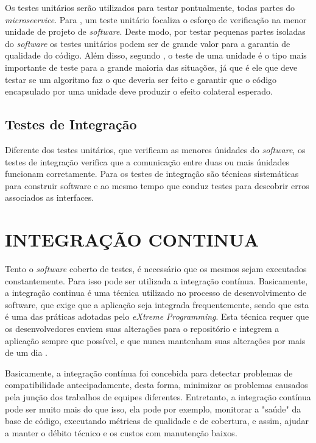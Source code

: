 Os testes unitários serão utilizados para testar pontualmente, todas partes do \textit{microseervice}. Para , um teste unitário focaliza o esforço de verificação na menor unidade de projeto de \textit{software}. Deste modo, por testar pequenas partes isoladas do \textit{software} os testes unitários podem ser de grande valor para a garantia de qualidade do código. Além disso, segundo , o teste de uma unidade é o tipo mais importante de teste para a grande maioria das situações, já que é ele que deve testar se um algoritmo faz o que deveria ser feito e garantir que o código encapsulado por uma unidade deve produzir o efeito colateral esperado.

\subsection{Testes de Integração}

Diferente dos testes unitários, que verificam as menores únidades do \textit{software}, os testes de integração verifica que a comunicação entre duas ou mais únidades funcionam corretamente. Para  os testes de integração são técnicas sistemáticas para construir software e ao mesmo tempo que conduz testes para descobrir erros associados as interfaces.

\section{INTEGRAÇÃO CONTINUA}

Tento o \textit{software} coberto de testes, é necessário que os mesmos sejam executados constantemente. Para isso pode ser utilizada a integração contínua. Basicamente, a integração continua é uma técnica utilizado no processo de desenvolvimento de software, que exige que a aplicação seja integrada frequentemente, sendo que esta é uma das práticas adotadas pelo \textit{eXtreme Programming}. Esta técnica requer que os desenvolvedores enviem suas alterações para o repositório e integrem a aplicação sempre que possível, e que nunca mantenham suas alterações por mais de um dia \cite{wells}. 

Basicamente, a integração contínua foi concebida para detectar problemas de compatibilidade antecipadamente, desta forma, minimizar os problemas causados pela junção dos trabalhos de equipes diferentes. Entretanto, a integração contínua pode ser muito mais do que isso, ela pode por exemplo, monitorar a "saúde"  da base de código, executando métricas de qualidade e de cobertura, e assim, ajudar a manter o débito técnico e os custos com manutenção baixos.

